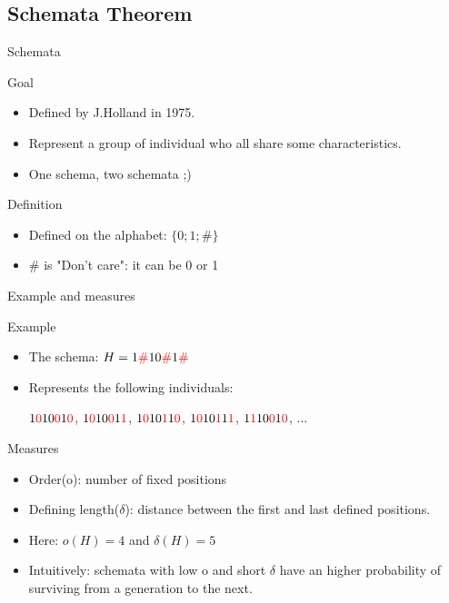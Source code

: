 \subsection{Schemata Theorem}
\begin{frame}{Schemata}
  \begin{block}{Goal}
    \begin{itemize}
    \item Defined by J.Holland in 1975\cite{holland1992}.
    \item Represent a group of individual who all share some characteristics.
    \item One schema, two schemata ;)
    \end{itemize}
  \end{block}    

  \begin{block}{Definition}
    \begin{itemize}
    \item Defined on the alphabet: $\{0;1;\#\}$
    \item $\#$ is "Don't care": it can be 0 or 1
    \end{itemize}
  \end{block}
\end{frame}

\begin{frame}{Example and measures}
  \begin{block}{Example}
    \begin{itemize}
    \item The schema: $H = 1\textcolor{red}{\#}10\textcolor{red}{\#}1\textcolor{red}{\#}$
    \item Represents the following individuals:
      \begin{center}
        $1\textcolor{red}{0}10\textcolor{red}{0}1\textcolor{red}{0}$,
        $1\textcolor{red}{0}10\textcolor{red}{0}1\textcolor{red}{1}$,
        $1\textcolor{red}{0}10\textcolor{red}{1}1\textcolor{red}{0}$,
        $1\textcolor{red}{0}10\textcolor{red}{1}1\textcolor{red}{1}$,
        $1\textcolor{red}{1}10\textcolor{red}{0}1\textcolor{red}{0}$,
        $\ldots$
      \end{center}
    \end{itemize}
  \end{block}

  \begin{block}{Measures}
    \begin{itemize}
      \item Order(o): number of fixed positions
      \item Defining length($\delta$): distance between the first and last defined positions.
      \item Here: $o(H) = 4$ and $\delta(H) = 5$
      \item Intuitively: schemata with low o and short $\delta$ have an higher probability of surviving from a generation to the next.
    \end{itemize}
  \end{block}
\end{frame}

